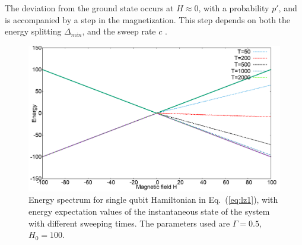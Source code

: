 \documentclass[../main.tex]{subfiles}
\begin{document}
The deviation from the ground state occurs at $H \approx 0$, with a probability $p'$, and is accompanied by a step in the magnetization. This step depends on both the energy splitting  $\Delta_{min}$, and the sweep rate $c$ \cite{de1997theory}.\\
\begin{figure}[H]
\centering 
\includegraphics[scale=0.24]{EnergySpec_1spin_H100.png}
\caption{Energy spectrum for single qubit Hamiltonian in Eq.~(\ref{eq:lz1}), with energy expectation values of the instantaneous state of the system with different sweeping times. The parameters used are $\Gamma=0.5$, $H_0=100$.}
\label{fig:lz1}
\end{figure}
\end{document}
